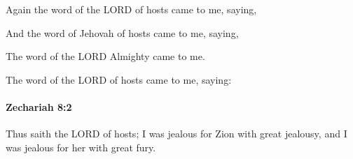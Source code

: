 			Again the word of the LORD of hosts came to me, saying,

			\begin{versebox}
					\item[BHS] 
					\item[LXX] 
					\item[ASV] And the word of Jehovah of hosts came to me, saying,
					\item[NIV] The word of the LORD Almighty came to me.
					\item[NRSV] The word of the LORD of hosts came to me, saying:
			\end{versebox}

		\paragraph{Zechariah 8:2} %
			\label{ZECHARIAH-8-2}

			Thus saith the LORD of hosts; I was jealous for Zion with great jealousy, and I was jealous for her with great fury.

